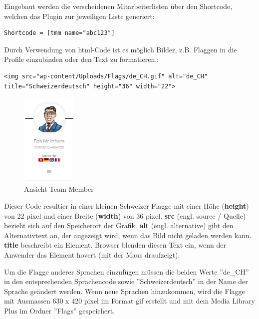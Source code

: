 \documentclass[a4paper,11pt,twoside,titlepage,openright]{report}
\numberwithin{equation}{section}		%
\numberwithin{figure}{section}			%
\numberwithin{table}{section}				%
\begin{document}
Eingebaut werden die verscheidenen Mitarbeiterlisten über den Shortcode, welchen das Plugin zur jeweiligen Liste generiert:

\lstset{language=html}
\begin{lstlisting}[frame=single]
Shortcode = [tmm name="abc123"]
\end{lstlisting}

Durch Verwendung von \acrshort{html}-Code ist es möglich Bilder, z.B. Flaggen in die Profile einzubinden oder den Text zu formatieren.:

\lstset{language=html}
\begin{lstlisting}[frame=single]
<img src="wp-content/Uploads/Flags/de_CH.gif" alt="de_CH"
title="Schweizerdeutsch" height="36" width="22">
\end{lstlisting}

\begin{figure}
\centering
\includegraphics[width=100px]{Images/Teammember.png}
\caption{Ansicht Team Member}
\end{figure}

Dieser Code resultier in einer kleinen Schweizer Flagge mit einer Höhe (\textbf{height}) von 22 \gls{pixel} und einer Breite (\textbf{width}) von 36 \gls{pixel}. \textbf{src} (engl. source / Quelle) bezieht sich auf den Speicherort der Grafik. \textbf{alt} (engl. alternative) gibt den Alternativtext an, der angezeigt wird, wenn das Bild nicht geladen werden kann. \textbf{title} beschreibt ein Element. Browser blenden diesen Text ein, wenn der Anwender das Element hovert (mit der Maus draufzeigt).

Um die Flagge anderer Sprachen einzufügen müssen die beiden Werte ''de\_CH'' in den entsprechenden Sprachencode sowie ''Schweizerdeutsch'' in der Name der Sprache geändert werden. Wenn neue Sprachen hinzukommen, wird die Flagge mit Ausmassen 630 x 420 \gls{pixel} im Format \acrshort{gif} erstellt und mit dem Media Library Plus im Ordner ''Flags'' gespeichert.
\newpage
\end{document}
